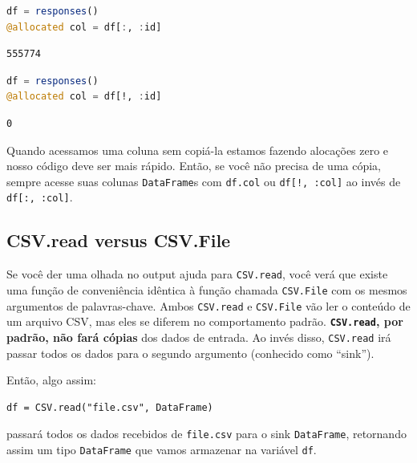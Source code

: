\documentclass[
  notoc %
]{tufte-book}
\newcommand{\passthrough}[1]{#1}
\begin{document}
\begin{lstlisting}[language=Julia]
df = responses()
@allocated col = df[:, :id]
\end{lstlisting}

\begin{lstlisting}
555774
\end{lstlisting}

\begin{lstlisting}[language=Julia]
df = responses()
@allocated col = df[!, :id]
\end{lstlisting}

\begin{lstlisting}
0
\end{lstlisting}

Quando acessamos uma coluna sem copiá-la estamos fazendo alocações zero
e nosso código deve ser mais rápido. Então, se você não precisa de uma
cópia, sempre acesse suas colunas \passthrough{\lstinline!DataFrame!}s
com \passthrough{\lstinline!df.col!} ou
\passthrough{\lstinline"df[!, :col]"} ao invés de
\passthrough{\lstinline!df[:, :col]!}.

\hypertarget{sec:df_performance_csv_read_file}{%
\subsection{CSV.read versus
CSV.File}\label{sec:df_performance_csv_read_file}}

Se você der uma olhada no output ajuda para
\passthrough{\lstinline!CSV.read!}, você verá que existe uma função de
conveniência idêntica à função chamada
\passthrough{\lstinline!CSV.File!} com os mesmos argumentos de
palavras-chave. Ambos \passthrough{\lstinline!CSV.read!} e
\passthrough{\lstinline!CSV.File!} vão ler o conteúdo de um arquivo CSV,
mas eles se diferem no comportamento padrão.
\textbf{\passthrough{\lstinline!CSV.read!}, por padrão, não fará cópias}
dos dados de entrada. Ao invés disso, \passthrough{\lstinline!CSV.read!}
irá passar todos os dados para o segundo argumento (conhecido como
``sink'').

Então, algo assim:

\begin{lstlisting}
df = CSV.read("file.csv", DataFrame)
\end{lstlisting}

passará todos os dados recebidos de \passthrough{\lstinline!file.csv!}
para o sink \passthrough{\lstinline!DataFrame!}, retornando assim um
tipo \passthrough{\lstinline!DataFrame!} que vamos armazenar na variável
\passthrough{\lstinline!df!}.
\end{document}
